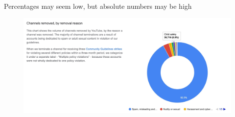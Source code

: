 \documentclass[nobackground,dvipsnames,table]{beamer}
\begin{document}
\begin{frame}{Percentages may seem low, but absolute numbers may be high}
    \begin{figure}
        \centering
        \includegraphics[width=\textwidth]{low-percentage-high-absolute}
    \end{figure}
\end{frame}
\end{document}
